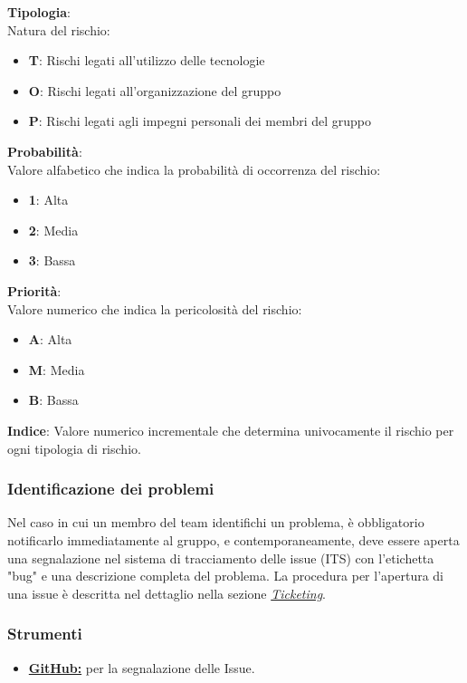 \begin{flushleft}
    \textbf{Tipologia}: \\
    Natura del rischio:
    \begin{itemize}
        \item \textbf{T}: Rischi legati all'utilizzo delle tecnologie
        \item \textbf{O}: Rischi legati all'organizzazione del gruppo
        \item \textbf{P}: Rischi legati agli impegni personali dei membri del gruppo
    \end{itemize}
    \textbf{Probabilità}: \\
    Valore alfabetico che indica la probabilità di occorrenza del rischio:
    \begin{itemize}
        \item \textbf{1}: Alta
        \item \textbf{2}: Media
        \item \textbf{3}: Bassa
    \end{itemize}
    \textbf{Priorità}: \\
    Valore numerico che indica la pericolosità del rischio:
    \begin{itemize}
        \item \textbf{A}: Alta
        \item \textbf{M}: Media
        \item \textbf{B}: Bassa
    \end{itemize}
    \textbf{Indice}: Valore numerico incrementale che determina univocamente il rischio per ogni tipologia di rischio. 
\end{flushleft}
\subsubsection{Identificazione dei problemi}
Nel caso in cui un membro del team identifichi un problema, è obbligatorio notificarlo immediatamente al gruppo, e contemporaneamente, deve essere aperta una segnalazione nel sistema di tracciamento delle issue (ITS) con l'etichetta "bug" e una descrizione completa del problema. La procedura per l'apertura di una issue è descritta nel dettaglio nella sezione \hyperlink{par:ticketing}{\textit{Ticketing}}.

\subsubsection{Strumenti}
\begin{itemize}
    \item \href{https://github.com/}{\textbf{GitHub:}} per la segnalazione delle Issue.
\end{itemize}